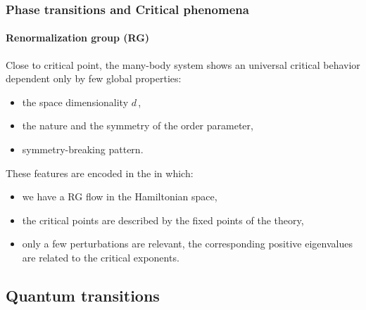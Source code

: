 \begin{frame}
\frametitle{Phase transitions and Critical phenomena}
\framesubtitle{Renormalization group (RG)}


Close to critical point, the many-body system shows an universal critical behavior dependent only by few global properties:
\begin{itemize}
\item \alert{the space dimensionality $d\,$},
\item \alert{the nature and the symmetry of the order parameter},
\item \alert{symmetry-breaking pattern}.
\end{itemize}
$ $\\
$ $\\
These features are encoded in the  in which:
\begin{itemize}
\item we have a RG flow in the Hamiltonian space,
\item the critical points are described by the fixed points of the theory,
\item only a few perturbations are relevant, the corresponding positive eigenvalues are related to the critical exponents.
\end{itemize}
\end{frame}


\subsection{Quantum transitions}

